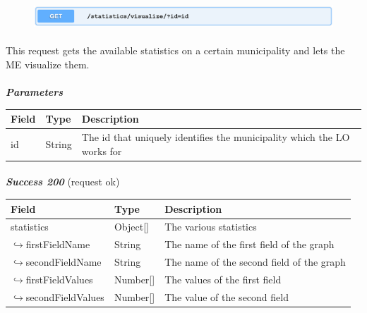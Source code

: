 						\clearpage
						\begin{figure}[!h]
							\includegraphics[width=\textwidth]{images/Restful/GetStatistics}
						\end{figure}
						\paragraph{}
						\vspace{-7.5mm}
						This request gets the available statistics on a certain municipality and lets the ME visualize them.
						\paragraph{}
							\textcolor{myBlue}{\textit{\textbf{Parameters}}}
							\vspace{-2mm}
							\begin{table}[!h]
								\begin{tabular}{L{0.15\textwidth}L{0.15\textwidth}L{0.58\textwidth}}
									\toprule
									\textbf{Field} & \textbf{Type} & \textbf{Description} \\
									\midrule
								 	id & String & The id that uniquely identifies the municipality which the LO works for \\
								 	\bottomrule
								\end{tabular}
							\end{table}
						\paragraph{}
							\textcolor{myGreen}{\textit{\textbf{Success 200}}} (request ok)
							\vspace{-2mm}
							\begin{table}[!h]
								\begin{tabular}{L{0.3\textwidth}L{0.15\textwidth}L{0.43\textwidth}}
									\toprule
									\textbf{Field} & \textbf{Type} & \textbf{Description} \\
									\midrule
									statistics & Object[] & The various statistics \\
									\hspace{2.5mm}$\hookrightarrow$firstFieldName & String & The name of the first field of the graph \\
									\hspace{2.5mm}$\hookrightarrow$secondFieldName & String & The name of the second field of the graph \\
									\hspace{2.5mm}$\hookrightarrow$firstFieldValues & Number[] & The values of the first field \\
									\hspace{2.5mm}$\hookrightarrow$secondFieldValues & Number[] & The value of the second field \\
								 	\bottomrule
								\end{tabular}
							\end{table}
